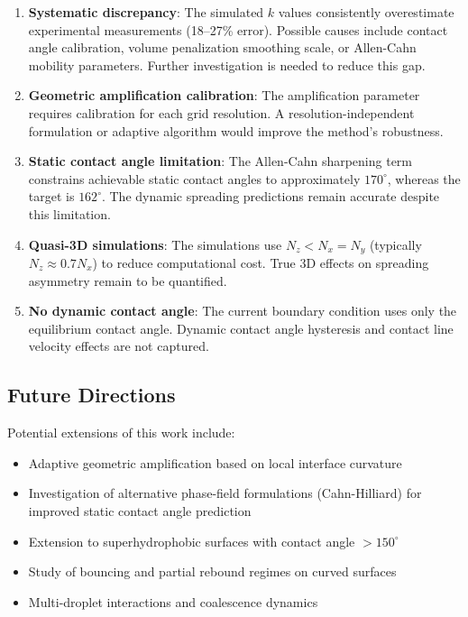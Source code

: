 \begin{enumerate}
    \item \textbf{Systematic discrepancy}: The simulated $k$ values consistently overestimate experimental measurements (18--27\% error). Possible causes include contact angle calibration, volume penalization smoothing scale, or Allen-Cahn mobility parameters. Further investigation is needed to reduce this gap.
    
    \item \textbf{Geometric amplification calibration}: The amplification parameter requires calibration for each grid resolution. A resolution-independent formulation or adaptive algorithm would improve the method's robustness.
    
    \item \textbf{Static contact angle limitation}: The Allen-Cahn sharpening term constrains achievable static contact angles to approximately $170^\circ$, whereas the target is $162^\circ$. The dynamic spreading predictions remain accurate despite this limitation.
    
    \item \textbf{Quasi-3D simulations}: The simulations use $N_z < N_x = N_y$ (typically $N_z \approx 0.7 N_x$) to reduce computational cost. True 3D effects on spreading asymmetry remain to be quantified.
    
    \item \textbf{No dynamic contact angle}: The current boundary condition uses only the equilibrium contact angle. Dynamic contact angle hysteresis and contact line velocity effects are not captured.
\end{enumerate}

\subsection{Future Directions}

Potential extensions of this work include:

\begin{itemize}
    \item Adaptive geometric amplification based on local interface curvature
    \item Investigation of alternative phase-field formulations (Cahn-Hilliard) for improved static contact angle prediction
    \item Extension to superhydrophobic surfaces with contact angle $> 150^\circ$
    \item Study of bouncing and partial rebound regimes on curved surfaces
    \item Multi-droplet interactions and coalescence dynamics
\end{itemize}

